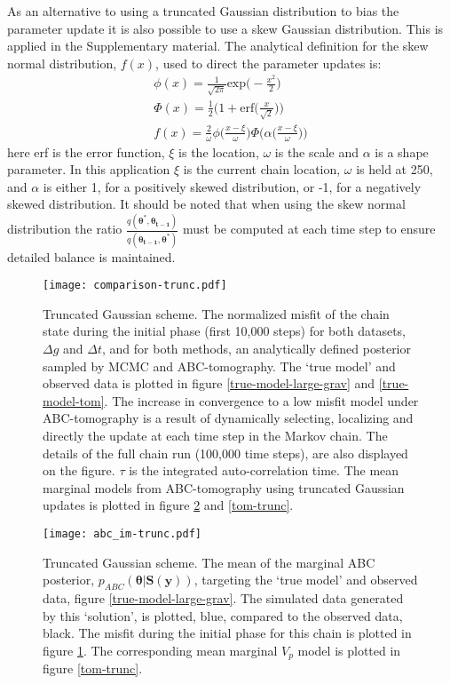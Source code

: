 As an alternative to using a truncated Gaussian distribution to bias the parameter update it is also possible to use a skew Gaussian distribution. This is applied in the Supplementary material. The analytical definition for the skew normal distribution, $f(x)$, used to direct the parameter updates is:
\begin{equation}
\begin{split}
\phi(x) = \frac{1}{\sqrt{2\pi}}\text{exp}\Big(-\frac{x^2}{2}\Big) \\
\Phi(x) = \frac{1}{2}\bigg(1 + \text{erf}\Big(\frac{x}{\sqrt{2}}\Big)\bigg)\\
f(x) = \frac{2}{\omega} \phi\bigg(\frac{x-\xi}{\omega}\bigg)\Phi\bigg(\alpha \Big(\frac{x-\xi}{\omega}\Big)\bigg)
\end{split}
\end{equation}
here erf is the error function, $\xi$ is the location, $\omega$ is the scale and $\alpha$ is a shape parameter. In this application  $\xi$ is the current chain location, $\omega$ is held at 250, and $\alpha$ is either 1, for a positively skewed distribution, or -1, for a negatively skewed distribution. It should be noted that when using the skew normal distribution the ratio $\frac{q(\bm{\theta^*},\bm{\theta_{t-1}})}{q(\bm{\theta_{t-1}},\bm{\theta^*})}$ must be computed at each time step to ensure detailed balance is maintained.

\begin{figure}[H]
	\centering
	\texttt{[image: comparison-trunc.pdf]}
	\caption{Truncated Gaussian scheme. The normalized misfit of the chain state during the initial phase (first 10,000 steps) for both datasets, $\Delta g$ and $\Delta t$, and for both methods, an analytically defined posterior sampled by MCMC and ABC-tomography. The `true model' and observed data is plotted in figure \ref{true-model-large-grav} and \ref{true-model-tom}. The increase in convergence to a low misfit model under ABC-tomography is a result of dynamically selecting, localizing and directly the update at each time step in the Markov chain. The details of the full chain run (100,000 time steps), are also displayed on the figure. $\tau$ is the integrated auto-correlation time. The mean marginal models from ABC-tomography using truncated Gaussian updates is plotted in figure \ref{grav-trunc} and \ref{tom-trunc}.}
	\label{comparison-trunc}
\end{figure}

\begin{figure}[H]
	\centering
	\texttt{[image: abc\_im-trunc.pdf]}
	\caption{Truncated Gaussian scheme. The mean of the marginal ABC posterior, $p_{ABC}(\bm{\theta}|\bm{S}(\bm{y}))$, targeting the `true model' and observed data, figure \ref{true-model-large-grav}. The simulated data generated by this `solution', is plotted, blue, compared to the observed data, black. The misfit during the initial phase for this chain is plotted in figure \ref{comparison-trunc}. The corresponding mean marginal $V_p$ model is plotted in figure \ref{tom-trunc}.}
	\label{grav-trunc}
\end{figure}

